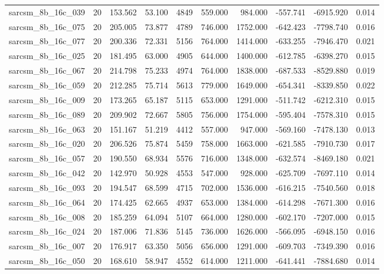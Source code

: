 \begin{tabular}{lrrrrrrrrr}
sarcsm\_8b\_16c\_039 & 20 & 153.562 & 53.100 & 4849 & 559.000 & 984.000 & -557.741 & -6915.920 & 0.014 \\
sarcsm\_8b\_16c\_075 & 20 & 205.005 & 73.877 & 4789 & 746.000 & 1752.000 & -642.423 & -7798.740 & 0.016 \\
sarcsm\_8b\_16c\_077 & 20 & 200.336 & 72.331 & 5156 & 764.000 & 1414.000 & -633.255 & -7946.470 & 0.021 \\
sarcsm\_8b\_16c\_025 & 20 & 181.495 & 63.000 & 4905 & 644.000 & 1400.000 & -612.785 & -6398.270 & 0.015 \\
sarcsm\_8b\_16c\_067 & 20 & 214.798 & 75.233 & 4974 & 764.000 & 1838.000 & -687.533 & -8529.880 & 0.019 \\
sarcsm\_8b\_16c\_059 & 20 & 212.285 & 75.714 & 5613 & 779.000 & 1649.000 & -654.341 & -8339.850 & 0.022 \\
sarcsm\_8b\_16c\_009 & 20 & 173.265 & 65.187 & 5115 & 653.000 & 1291.000 & -511.742 & -6212.310 & 0.015 \\
sarcsm\_8b\_16c\_089 & 20 & 209.902 & 72.667 & 5805 & 756.000 & 1754.000 & -595.404 & -7578.310 & 0.015 \\
sarcsm\_8b\_16c\_063 & 20 & 151.167 & 51.219 & 4412 & 557.000 & 947.000 & -569.160 & -7478.130 & 0.013 \\
sarcsm\_8b\_16c\_020 & 20 & 206.526 & 75.874 & 5459 & 758.000 & 1663.000 & -621.585 & -7910.730 & 0.017 \\
sarcsm\_8b\_16c\_057 & 20 & 190.550 & 68.934 & 5576 & 716.000 & 1348.000 & -632.574 & -8469.180 & 0.021 \\
sarcsm\_8b\_16c\_042 & 20 & 142.970 & 50.928 & 4553 & 547.000 & 928.000 & -625.709 & -7697.110 & 0.014 \\
sarcsm\_8b\_16c\_093 & 20 & 194.547 & 68.599 & 4715 & 702.000 & 1536.000 & -616.215 & -7540.560 & 0.018 \\
sarcsm\_8b\_16c\_064 & 20 & 174.425 & 62.665 & 4937 & 653.000 & 1384.000 & -614.298 & -7671.300 & 0.016 \\
sarcsm\_8b\_16c\_008 & 20 & 185.259 & 64.094 & 5107 & 664.000 & 1280.000 & -602.170 & -7207.000 & 0.015 \\
sarcsm\_8b\_16c\_024 & 20 & 187.006 & 71.836 & 5145 & 736.000 & 1626.000 & -566.095 & -6948.150 & 0.016 \\
sarcsm\_8b\_16c\_007 & 20 & 176.917 & 63.350 & 5056 & 656.000 & 1291.000 & -609.703 & -7349.390 & 0.016 \\
sarcsm\_8b\_16c\_050 & 20 & 168.610 & 58.947 & 4552 & 614.000 & 1211.000 & -641.441 & -7884.680 & 0.014 \\

\end{tabular}
